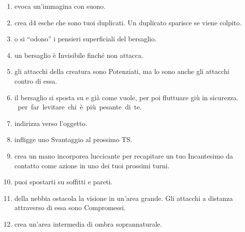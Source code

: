 \documentclass[itdr]{subfiles}
\begin{document}
\begin{enumerate}
	\item {} evoca un'immagina con suono.
	\item {} crea d4 esche che sono tuoi duplicati. Un duplicato sparisce se viene colpito.
	\item {}  o si \mbox{``odono''} i pensieri superficiali del bersaglio.
	\item {} un bersaglio è Invisibile finché non attacca.
	\item {} gli attacchi della creatura sono Potenziati, ma lo sono anche gli attacchi contro di essa.
	\item {} il bersaglio si sposta su e già come vuole, per poi fluttuare giù in sicurezza. \mbox{ per far levitare chi è più pesante di te}.
	\item {} indirizza verso l'oggetto.
	\item {} infligge uno Svantaggio al prossimo TS.
	\item {} crea un mano incorporea luccicante per recapitare un tuo Incantesimo da contatto come azione in uno dei tuoi prossimi turni.
	\item {} puoi spostarti su soffitti e pareti.
	\item {} della nebbia ostacola la visione in un'area grande. Gli attacchi a distanza attraverso di essa sono Compromessi.
	\item {} crea un'area intermedia di ombra soprannaturale.

\vfill
\break


\end{enumerate}
\end{document}
